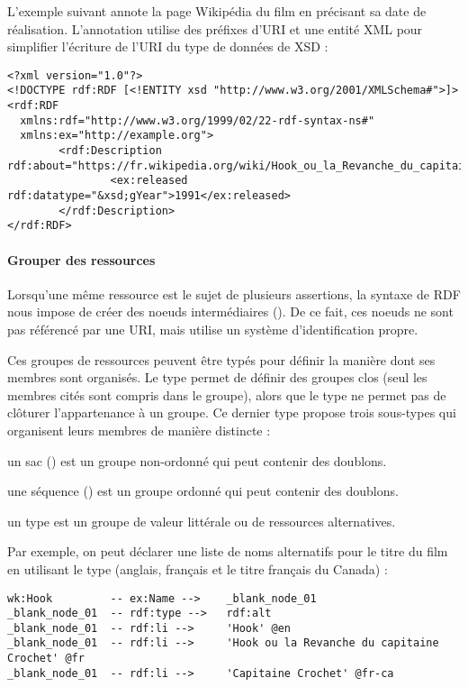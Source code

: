 L'exemple suivant annote la page Wikipédia du film  en précisant sa date de réalisation. L'annotation utilise des préfixes d'URI et une entité XML pour simplifier l'écriture de l'URI du type de données  de XSD : 
\begin{Verbatim}[fontsize=\small,formatcom=\color{black!70}]
<?xml version="1.0"?>
<!DOCTYPE rdf:RDF [<!ENTITY xsd "http://www.w3.org/2001/XMLSchema#">]>
<rdf:RDF
  xmlns:rdf="http://www.w3.org/1999/02/22-rdf-syntax-ns#"
  xmlns:ex="http://example.org">
        <rdf:Description rdf:about="https://fr.wikipedia.org/wiki/Hook_ou_la_Revanche_du_capitaine_Crochet">
                <ex:released rdf:datatype="&xsd;gYear">1991</ex:released>
        </rdf:Description>
</rdf:RDF>
\end{Verbatim}

\paragraph{Grouper des ressources}
Lorsqu'une même ressource est le sujet de plusieurs assertions, la syntaxe de RDF nous impose de créer des noeuds intermédiaires ().
De ce fait, ces noeuds ne sont pas référencé par une URI, mais utilise un système d'identification propre.

Ces groupes de ressources peuvent être typés pour définir la manière dont ses membres sont organisés.
Le type  permet de définir des groupes clos (seul les membres cités sont compris dans le groupe), alors que le type  ne permet pas de clôturer l'appartenance à un groupe.
Ce dernier type propose trois sous-types qui organisent leurs membres de manière distincte : 

\begin{liste}
  \item un sac () est un groupe non-ordonné qui peut contenir des doublons.
  \item une séquence () est un groupe ordonné qui peut contenir des doublons. 
  \item un type  est un groupe de valeur littérale ou de ressources alternatives.
\end{liste}

Par exemple, on peut déclarer une liste de noms alternatifs pour le titre du film  en utilisant le type  (anglais, français et le titre français du Canada) :
\begin{Verbatim}[fontsize=\small,formatcom=\color{black!70}]
wk:Hook         -- ex:Name -->    _blank_node_01
_blank_node_01  -- rdf:type -->   rdf:alt
_blank_node_01  -- rdf:li -->     'Hook' @en 
_blank_node_01  -- rdf:li -->     'Hook ou la Revanche du capitaine Crochet' @fr
_blank_node_01  -- rdf:li -->     'Capitaine Crochet' @fr-ca
\end{Verbatim}



